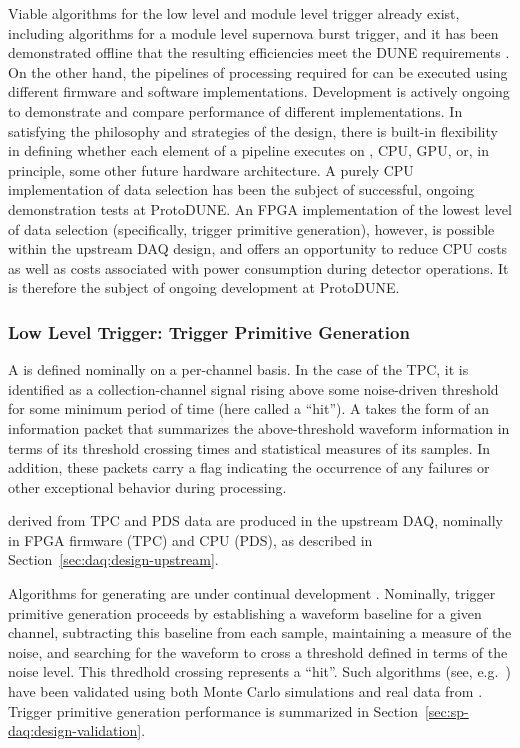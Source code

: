 Viable algorithms for the low level and module level trigger already exist, including
algorithms for a module level supernova burst trigger, and it has
been demonstrated offline that the resulting efficiencies meet the DUNE
requirements \cite{xx}. On the other hand, the pipelines of processing required
for  can be executed using different firmware and software
implementations. Development is actively ongoing to demonstrate
and compare performance of different implementations. In satisfying
the philosophy and strategies of the  design, there is built-in
flexibility in defining whether each element of a pipeline executes on
, CPU, GPU, or, in principle, some other future hardware
architecture. A purely CPU implementation of data selection has been
the subject of successful, ongoing demonstration 
tests at ProtoDUNE. An FPGA implementation of the lowest level of data selection
(specifically, trigger primitive generation), 
however, is possible within the upstream DAQ design, and offers an
opportunity to reduce CPU costs as well as costs associated with power
consumption during detector operations. It is therefore the subject of
ongoing development at ProtoDUNE.

\subsubsection{Low Level Trigger: Trigger Primitive Generation}
\label{sec:sp-daq:design-trigger-primitives}

A  is defined nominally on a per-channel basis. In the case of
the \single TPC, it is identified as a collection-channel signal rising above some
noise-driven threshold for some minimum period of time (here called a
``hit'').
A  takes the form of an information packet that 
summarizes the above-threshold waveform information in terms of its
threshold crossing times and statistical measures of its  samples. 
In addition, these packets carry a flag indicating the occurrence of any
failures or other exceptional behavior during  processing.

 derived from TPC and PDS data
are produced in the upstream DAQ,
nominally in FPGA firmware (TPC) and CPU (PDS), as described in
Section~\ref{sec:daq:design-upstream}.

Algorithms for generating  are under continual development
\cite{docid-11275}. Nominally, trigger primitive generation proceeds
by establishing a waveform baseline
for a given channel, subtracting this baseline from each sample, maintaining
a measure of the noise, and searching for the waveform to cross a
threshold defined in terms of the noise level. This thredhold crossing
represents a ``hit''. 
Such algorithms (see, e.g.~\cite{docid-11236}) have been validated
using both Monte Carlo simulations and 
real data from . 
Trigger primitive generation performance is summarized in
Section~\ref{sec:sp-daq:design-validation}.

